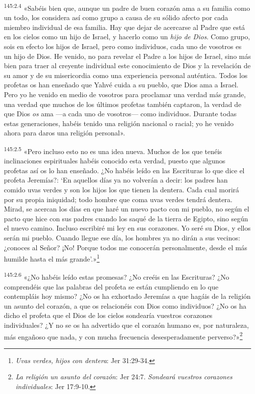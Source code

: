 \par 
\textsuperscript{145:2.4} «Sabéis bien que, aunque un padre de buen corazón ama a su familia como un todo, los considera así como grupo a causa de su sólido afecto por cada miembro individual de esa familia. Hay que dejar de acercarse al Padre que está en los cielos como un hijo de Israel, y hacerlo como un \textit{hijo de Dios}. Como grupo, sois en efecto los hijos de Israel, pero como individuos, cada uno de vosotros es un hijo de Dios. He venido, no para revelar el Padre a los hijos de Israel, sino más bien para traer al creyente individual este conocimiento de Dios y la revelación de su amor y de su misericordia como una experiencia personal auténtica. Todos los profetas os han enseñado que Yahvé cuida a su pueblo, que Dios ama a Israel. Pero yo he venido en medio de vosotros para proclamar una verdad más grande, una verdad que muchos de los últimos profetas también captaron, la verdad de que Dios \textit{os} ama ---a cada uno de vosotros--- como individuos. Durante todas estas generaciones, habéis tenido una religión nacional o racial; yo he venido ahora para daros una religión personal».

\par 
\textsuperscript{145:2.5} «Pero incluso esto no es una idea nueva. Muchos de los que tenéis inclinaciones espirituales habéis conocido esta verdad, puesto que algunos profetas así os lo han enseñado. ¿No habéis leído en las Escrituras lo que dice el profeta Jeremías?: `En aquellos días ya no volverán a decir: los padres han comido uvas verdes y son los hijos los que tienen la dentera. Cada cual morirá por su propia iniquidad; todo hombre que coma uvas verdes tendrá dentera. Mirad, se acercan los días en que haré un nuevo pacto con mi pueblo, no según el pacto que hice con sus padres cuando los saqué de la tierra de Egipto, sino según el nuevo camino. Incluso escribiré mi ley en sus corazones. Yo seré su Dios, y ellos serán mi pueblo. Cuando llegue ese día, los hombres ya no dirán a sus vecinos: ¿conoces al Señor? ¡No! Porque todos me conocerán personalmente, desde el más humilde hasta el más grande'.»\footnote{\textit{Uvas verdes, hijos con dentera}: Jer 31:29-34.}

\par 
\textsuperscript{145:2.6} «¿No habéis leído estas promesas? ¿No creéis en las Escrituras? ¿No comprendéis que las palabras del profeta se están cumpliendo en lo que contempláis hoy mismo? ¿No os ha exhortado Jeremías a que hagáis de la religión un asunto del corazón, a que os relacionéis con Dios como individuos? ¿No os ha dicho el profeta que el Dios de los cielos sondearía vuestros corazones individuales? ¿Y no se os ha advertido que el corazón humano es, por naturaleza, más engañoso que nada, y con mucha frecuencia desesperadamente perverso?»\footnote{\textit{La religión un asunto del corazón}: Jer 24:7. \textit{Sondeará vuestros corazones individuales}: Jer 17:9-10.}

